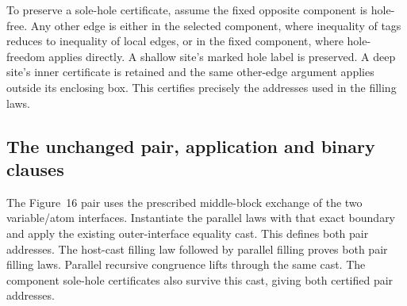 



To preserve a sole-hole certificate, assume the fixed opposite component
is hole-free. Any other edge is either in the selected component, where
inequality of tags reduces to inequality of local edges, or in the fixed
component, where hole-freedom applies directly. A shallow site's marked hole
label is preserved. A deep site's inner certificate is retained and the same
other-edge argument applies outside its enclosing box. This certifies precisely
the addresses used in the filling laws.






\subsection{The unchanged pair, application and binary clauses}

The Figure~16 pair uses the prescribed middle-block exchange of the two
variable/atom interfaces. Instantiate the parallel laws with that exact
boundary and apply the existing outer-interface equality cast. This defines
both pair addresses. The host-cast filling law followed by parallel filling
proves both pair filling laws. Parallel recursive congruence lifts through
the same cast. The component sole-hole certificates also survive this cast,
giving both certified pair addresses.





